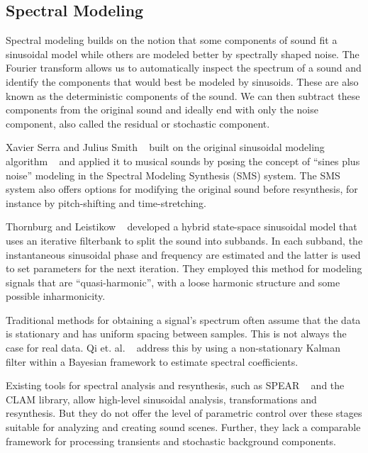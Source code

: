 \documentclass{acmsiggraph}               %
\begin{document}
\subsection{Spectral Modeling}

Spectral modeling builds on the notion that some components of sound fit a sinusoidal model 
while others are modeled better by spectrally shaped noise. The Fourier transform allows us to 
automatically inspect the spectrum of a sound and identify the components that would best be modeled by sinusoids. These are also known as the deterministic components of the sound. We can then 
subtract these components from the original sound and ideally end with only the noise 
component, also called the residual or stochastic component. 

Xavier Serra and Julius Smith ~ built on the original sinusoidal 
modeling algorithm ~\cite{McAulay86} and applied it to musical sounds by posing the concept 
of ``sines plus noise'' modeling in the Spectral Modeling Synthesis (SMS) system. The SMS system 
also offers options for modifying the original sound before resynthesis, for instance by 
pitch-shifting and time-stretching.

Thornburg and Leistikow ~ developed a hybrid state-space sinusoidal 
model that uses an iterative filterbank to split the sound into subbands. In each subband, the 
instantaneous sinusoidal phase and frequency are estimated and the latter is used to set 
parameters for the next iteration. They employed this method for modeling signals that are 
``quasi-harmonic'', with a loose harmonic structure and some possible inharmonicity. 

Traditional methods for obtaining a signal's spectrum often assume that the data is stationary 
and has uniform spacing between samples. This is not always the case for real data. Qi et. al. 
~ address this by using a non-stationary Kalman filter within a Bayesian 
framework to estimate spectral coefficients. 

Existing tools for spectral analysis and resynthesis, such as SPEAR ~\cite{Klingbeil05}
and the CLAM library, allow high-level sinusoidal analysis, transformations and resynthesis. 
But they do not offer the level of parametric control over these stages suitable for analyzing 
and creating sound scenes. Further, they lack a comparable framework for processing transients 
and stochastic background components.

\end{document}
